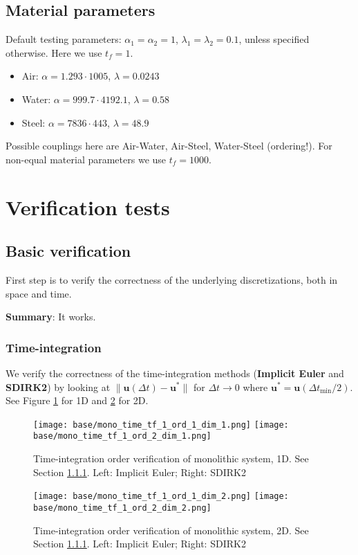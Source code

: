 \documentclass[a4paper,10pt]{article}
\begin{document}
\subsection{Material parameters}
% 
Default testing parameters: $\alpha_1 = \alpha_2 = 1$, $\lambda_1 = \lambda_2 = 0.1$, unless specified otherwise. Here we use $t_f = 1$.
% 
\begin{itemize}
\item Air: $\alpha = 1.293\cdot1005$, $\lambda = 0.0243$
\item Water: $\alpha = 999.7\cdot4192.1
$, $\lambda = 0.58$
\item Steel: $\alpha = 7836\cdot443$, $\lambda = 48.9
$
\end{itemize}
% 
Possible couplings here are Air-Water, Air-Steel, Water-Steel (ordering!). For non-equal material parameters we use $t_f = 1000$.
% 
\section{Verification tests}
\subsection{Basic verification}
% 
First step is to verify the correctness of the underlying discretizations, both in space and time. 

\textbf{Summary}: It works.
% 
\subsubsection{Time-integration}\label{SEC MONO TIME INT}
% 
We verify the correctness of the time-integration methods (\textbf{Implicit Euler} and \textbf{SDIRK2}) by looking at $\| \bm{u}(\Delta t) - \bm{u}^*\|$ for $\Delta t\rightarrow 0$ where $\bm{u}^* = \bm{u}(\Delta t_{\min}/2)$. See Figure \ref{FIG MONO TIME 1D} for 1D and \ref{FIG MONO TIME 2D} for 2D.

\begin{figure}[!ht]
\texttt{[image: base/mono\_time\_tf\_1\_ord\_1\_dim\_1.png]}
\texttt{[image: base/mono\_time\_tf\_1\_ord\_2\_dim\_1.png]}
\caption{Time-integration order verification of monolithic system, 1D. See Section \ref{SEC MONO TIME INT}. Left: Implicit Euler; Right: SDIRK2}
\label{FIG MONO TIME 1D}
\end{figure}

\begin{figure}[!ht]
\texttt{[image: base/mono\_time\_tf\_1\_ord\_1\_dim\_2.png]}
\texttt{[image: base/mono\_time\_tf\_1\_ord\_2\_dim\_2.png]}
\caption{Time-integration order verification of monolithic system, 2D. See Section \ref{SEC MONO TIME INT}. Left: Implicit Euler; Right: SDIRK2}
\label{FIG MONO TIME 2D}
\end{figure}
% 
\FloatBarrier
% 
\end{document}
